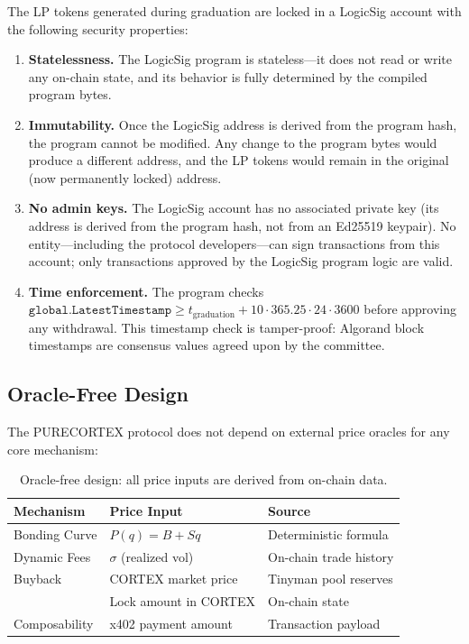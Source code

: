 The LP tokens generated during graduation are locked in a LogicSig account
with the following security properties:

\begin{enumerate}
  \item \textbf{Statelessness.} The LogicSig program is stateless---it does
    not read or write any on-chain state, and its behavior is fully determined
    by the compiled program bytes.
  \item \textbf{Immutability.} Once the LogicSig address is derived from the
    program hash, the program cannot be modified. Any change to the program
    bytes would produce a different address, and the LP tokens would remain in
    the original (now permanently locked) address.
  \item \textbf{No admin keys.} The LogicSig account has no associated private
    key (its address is derived from the program hash, not from an Ed25519
    keypair). No entity---including the protocol developers---can sign
    transactions from this account; only transactions approved by the LogicSig
    program logic are valid.
  \item \textbf{Time enforcement.} The program checks
    $\texttt{global.LatestTimestamp} \geq t_{\text{graduation}} + 10 \cdot
    365.25 \cdot 24 \cdot 3600$ before approving any withdrawal. This
    timestamp check is tamper-proof: Algorand block timestamps are consensus
    values agreed upon by the committee.
\end{enumerate}

\subsection{Oracle-Free Design}
\label{subsec:oracle-free}

The PURECORTEX protocol does not depend on external price oracles for any core
mechanism:

\begin{table}[H]
\centering
\caption{Oracle-free design: all price inputs are derived from on-chain data.}
\label{tab:oracle-free}
\begin{tabular}{@{}lll@{}}
\toprule
\textbf{Mechanism} & \textbf{Price Input} & \textbf{Source} \\
\midrule
Bonding Curve & $P(q) = B + Sq$ & Deterministic formula \\
Dynamic Fees & $\sigma$ (realized vol) & On-chain trade history \\
Buyback & CORTEX market price & Tinyman pool reserves \\
\veCORTEX{} & Lock amount in CORTEX & On-chain state \\
Composability & x402 payment amount & Transaction payload \\
\bottomrule
\end{tabular}
\end{table}

